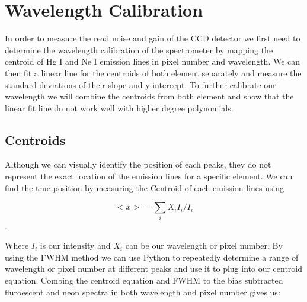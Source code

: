 \documentclass[onecolumn, 12pt, a4paper]{article}
\begin{document}
\section{Wavelength Calibration} \label{calibration}
In order to measure the read noise and gain of the CCD detector we first need to determine the wavelength calibration of the spectrometer by mapping the centroid of Hg I and Ne I emission lines in pixel number and wavelength. We can then fit a linear line for the centroids of both element separately and measure the standard deviations of their slope and y-intercept. To further calibrate our wavelength we will combine the centroids from both element and show that the linear fit line do not work well with higher degree polynomials.

\subsection{Centroids} \label{centroids}
Although we can visually identify the position of each peaks, they do not represent the exact location of the emission lines for a specific element. We can find the true position by measuring the Centroid of each emission lines using 

\[<x> = \sum_{i}{X_i I_i }/{I_i}\].

Where $I_i$ is our intensity and $X_i$ can be our wavelength or pixel number. By using the FWHM method we can use Python to repeatedly determine a range of wavelength or pixel number at different peaks and use it to plug into our centroid equation. Combing the centroid equation and FWHM to the bias subtracted fluroescent and neon spectra in both wavelength and pixel number gives us:
\end{document}
